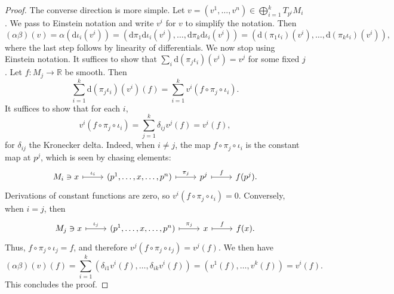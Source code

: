\documentclass[11pt, letterpaper]{article}
\theoremstyle{plain}
\begin{document}
\begin{proof}
		
	The converse direction is more simple. Let $v=(v^1, \ldots ,v^n)\in \bigoplus_{i=1}^k T_{p^i} M_i$. We pass to Einstein notation and write $v^i$ for $v$ to simplify the notation. Then
	\[
		(\alpha \beta )(v)=\alpha (\mathrm{d} \iota _i(v^i))=\left( \mathrm{d} \pi _1\mathrm{d} \iota _i(v^i), \ldots ,\mathrm{d} \pi _k\mathrm{d} \iota _i(v^i) \right) =(\mathrm{d} (\pi _1\iota _i)(v^i), \ldots ,\mathrm{d} (\pi_k\iota _i)(v^i)),
	\]
	where the last step follows by linearity of differentials. We now stop using Einstein notation. It suffices to show that $\sum_{i} \mathrm{d} (\pi _j\iota _i)(v^i)=v^j$ for some fixed $j$. Let $f : M_j \to \mathbb{R} $ be smooth. Then
	\[
		\sum_{i=1}^{k} \mathrm{d} (\pi _j\iota _i)(v^i)(f)=\sum_{i=1}^{k} v^i(f\circ \pi _j\circ \iota _i)
	.\]
	It suffices to show that for each $i$,
	\[
		v^i(f\circ \pi _j\circ \iota _i)=\sum_{j=1}^{k} \delta _{ij} v^j(f)=v^i(f),
	\]
	for $\delta _{ij} $ the Kronecker delta. Indeed, when $i\neq j$, the map $f\circ \pi _j\circ \iota _i$ is the constant map at $p^j$, which is seen by chasing elements:
	\[\begin{tikzcd}[row sep = 2.5em, column sep = 2.5em]
	M_i\ni x \ar[" \iota _i ", mapsto, r]  & (p^1, \ldots ,x, \ldots ,p^n)\ar[" \pi _j ", mapsto,r]  & p^j \ar[" f ", mapsto, r]  & f(p^j).
	\end{tikzcd}\]
	Derivations of constant functions are zero, so $v^i(f\circ \pi _j\circ \iota _i)=0$. Conversely, when $i=j$, then
	\[\begin{tikzcd}[row sep = 2.5em, column sep = 2.5em]
	M_j\ni x \ar[" \iota _j ", mapsto, r]  & (p^1, \ldots ,x, \ldots ,p^n)\ar[" \pi _j ", mapsto,r]  & x \ar[" f ", mapsto, r]  & f(x).
	\end{tikzcd}\]
	Thus, $f\circ \pi _j\circ \iota _j=f$, and therefore $v^j(f\circ \pi _j\circ \iota _j)=v^j(f)$. We then have
	\[
		(\alpha \beta )(v)(f)=\sum_{i=1}^{k} (\delta_{i1} v^i(f), \ldots , \delta_{ik} v^i(f))=(v^1(f), \ldots ,v^k(f))=v^i(f)
	.\]
	This concludes the proof.
\end{proof}
\end{document}

